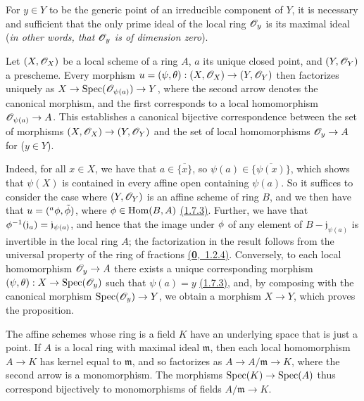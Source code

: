 \begin{cor}[2.4.3]
\label{cor-1.2.4.3}
For $y\in Y$ to be the generic point of an
irreducible component of $Y$, it is necessary and sufficient that the only prime
ideal of the local ring $\mathscr{O}_y$ is its maximal ideal ({\it in other words, that
$\mathscr{O}_y$ is of {\it dimension zero}}).
\end{cor}

\begin{prop}[2.4.4]
\label{prop-1.2.4.4}
Let $(X,\mathscr{O}_X)$ be a local scheme of a ring
$A$, $a$ its unique closed point, and $(Y,\mathscr{O}_Y)$ a prescheme. Every morphism
$u=(\psi,\theta):(X,\mathscr{O}_X)\to(Y,\mathscr{O}_Y)$ then factorizes uniquely as
$X\to{\mathop{\mathrm{Spec}}\nolimits}(\mathscr{O}_{\psi(a)})\to Y$, where the second arrow denotes the canonical
morphism, and the first corresponds to a local homomorphism $\mathscr{O}_{\psi(a)}\to A$.
This establishes a canonical bijective correspondence between the set of
morphisms $(X,\mathscr{O}_X)\to(Y,\mathscr{O}_Y)$ and the set of local homomorphisms $\mathscr{O}_y\to A$
for ($y\in Y$).
\end{prop}

Indeed, for all $x\in X$, we have that $a\in\overline{\{x\}}$, so
$\psi(a)\in\overline{\{\psi(x)\}}$, which shows that $\psi(X)$ is contained in
every affine open containing $\psi(a)$. So it suffices to consider the case
where $(Y,\mathscr{O}_Y)$ is an affine scheme of ring $B$, and we then have that
$u=({}^a\phi,\tilde{\phi})$, where $\phi\in{\mathop{\mathrm{Hom}}\nolimits}(B,A)$ \hyperref[thm-1.1.7.3]{(1.7.3)}. Further,
we have that $\phi^{-1}(\mathfrak{j}_a)=\mathfrak{j}_{\psi(a)}$, and hence
that the image under $\phi$ of any element of
$B-\mathfrak{j}_{\psi(a)}$ is invertible in the local ring $A$; the
factorization in the result follows from the universal property of the ring of
fractions \hyperref[env-0.1.2.4]{(\textbf{0},~1.2.4)}. Conversely, to each local homomorphism
$\mathscr{O}_y\to A$ there exists a unique corresponding morphism
$(\psi,\theta):X\to{\mathop{\mathrm{Spec}}\nolimits}(\mathscr{O}_y)$ such that $\psi(a)=y$ \hyperref[thm-1.1.7.3]{(1.7.3)}, and,
by composing with the canonical morphism ${\mathop{\mathrm{Spec}}\nolimits}(\mathscr{O}_y)\to Y$, we obtain a morphism
$X\to Y$, which proves the proposition.

\begin{env}[2.4.5]
\label{env-1.2.4.5}
The affine schemes whose ring is a field $K$ have an
underlying space that is just a point. If $A$ is a local ring with maximal
ideal $\mathfrak{m}$, then each local homomorphism $A\to K$ has kernel equal to
$\mathfrak{m}$, and so factorizes as $A\to A/\mathfrak{m}\to K$, where the
second arrow is a monomorphism. The morphisms ${\mathop{\mathrm{Spec}}\nolimits}(K)\to{\mathop{\mathrm{Spec}}\nolimits}(A)$ thus
correspond bijectively to monomorphisms of fields $A/\mathfrak{m}\to K$.
\end{env}

